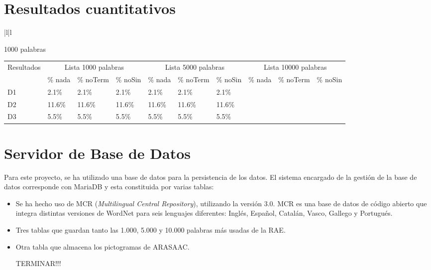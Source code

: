 \section{Resultados cuantitativos}
\label{cap:sec:pruebaCuantitativa}

\begin{table}
\centering
\begin{tabular}{|l|l}
	
	 {1000 palabras}\\ 
	
\end{tabular}
\end{table}
\begin{table}
	\begin{tabular}{|l|l|l|l|l|l|l|l|l|l|}
		\hline
		\multirow{2}{*}{Resultados} &
		\multicolumn{3}{c}{Lista 1000 palabras} &
		\multicolumn{3}{c}{Lista 5000 palabras} &
		\multicolumn{3}{c|}{Lista 10000 palabras} \\
		& \% nada & \% noTerm & \% noSin &\% nada & \% noTerm & \% noSin & \% nada & \% noTerm & \% noSin \\
		\hline
		D1 & 2.1\% & 2.1\% & 2.1\% & 2.1\% & 2.1\% & 2.1\% \\
		\hline
		D2 & 11.6\% & 11.6\% & 11.6\% & 11.6\% & 11.6\% & 11.6\% \\
		\hline
		D3 & 5.5\% & 5.5\% & 5.5\% & 5.5\% & 5.5\% & 5.5\% \\
		\hline
	\end{tabular}
\end{table}


\section{Servidor de Base de Datos}
Para este proyecto, se ha utilizado una base de datos para la persistencia de los datos. El sistema encargado de la gestión de la base de datos corresponde con MariaDB y esta constituida por varias tablas:
\begin{itemize}
	\item Se ha hecho uso de MCR (\textit{Multilingual Central Repository}), utilizando la versión 3.0. MCR es una base de datos de código abierto que integra distintas versiones de WordNet para seis lenguajes diferentes: Inglés, Español, Catalán, Vasco, Gallego y Portugués. 
	\item Tres tablas que guardan tanto las 1.000, 5.000 y 10.000 palabras más usadas de la RAE.
	\item Otra tabla que almacena los pictogramas de ARASAAC. 
	
	
	
	TERMINAR!!! 
\end{itemize}


